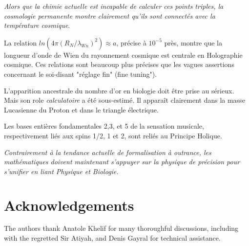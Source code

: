 \documentclass[a4paper,9pt]{article}
\begin{document}
\textit{ Alors que la chimie actuelle est incapable de calculer ces points triples, la cosmologie permanente montre clairement qu'ils sont connectés avec la température cosmique}. 


La relation $ln(4\pi (R_N/\lambda_{Wn})^2) \approx a$, précise à $10^{-5}$ près, montre que la longueur d'onde de Wien du rayonnement cosmique est centrale en Holographie cosmique. Ces relations sont beaucoup plus précises que les vagues assertions concernant le soi-disant "réglage fin" (fine tuning").  
 


L'apparition ancestrale du nombre d'or en biologie doit être prise au sérieux. Mais son role \textit{calculatoire} a été sous-estimé. Il apparaît clairement dans la masse Lucasienne du Proton et dans le triangle électrique.

Les bases entières fondamentales 2,3, et 5 de la sensation musicale, respectivement liés aux spins 1/2, 1 et 2, sont reliés au Principe Holique. 

\textit{Contrairement à la tendance actuelle de formalisation à outrance, les mathématiques doivent maintenant s’appuyer sur la physique de précision pour s'unifier en liant Physique et Biologie.} 




\section {Acknowledgements}

The authors thank Anatole Khelif for many thoroughful discussions, including with the regretted Sir Atiyah, and Denis Gayral for technical assistance.
\end{document}
